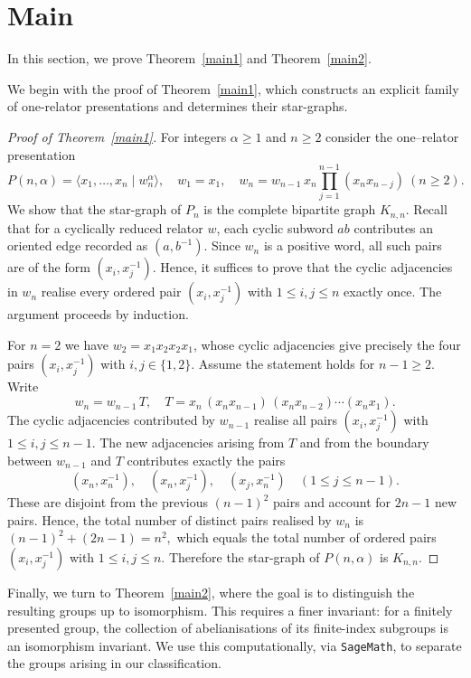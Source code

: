 \documentclass[a4paper,12pt,oneside]{article}
\begin{document}
\section{Main}\label{sec:proofs}

In this section, we prove Theorem~\ref{main1} and Theorem~\ref{main2}. 

\medskip
We begin with the proof of Theorem~\ref{main1}, which constructs an explicit family of one-relator presentations and determines their star-graphs. 
\begin{proof}[Proof of Theorem~\ref{main1}]
For integers $\alpha\ge 1$ and $n\geq 2$ consider the one--relator presentation
\[
P(n,\alpha)=\langle x_1,\dots,x_n\mid w_n^\alpha\rangle,
\quad 
 w_1=x_1,\quad 
 w_n=w_{n-1}\,x_n\prod_{j=1}^{n-1}(x_nx_{n-j})\ (n\ge 2).
\]
We show that the star-graph of $P_n$ is the complete bipartite graph $K_{n,n}$. Recall that for a cyclically reduced relator $w$, each cyclic subword $ab$ contributes an oriented edge recorded as $(a,b^{-1})$.  Since $w_n$ is a positive word, all such pairs are of the form $(x_i,x_j^{-1})$.  Hence, it suffices to prove that the cyclic adjacencies in $w_n$ realise every ordered pair $(x_i,x_j^{-1})$ with $1\le i,j\le n$ exactly once. The argument proceeds by induction. 

\medskip
For $n=2$ we have $w_2=x_1x_2x_2x_1$, whose cyclic adjacencies give precisely the four pairs $(x_i,x_j^{-1})$ with $i,j\in\{1,2\}$.  Assume the statement holds for $n-1\ge 2$.  Write
\[
w_n = w_{n-1}\,T,
\quad 
T = x_n\,(x_nx_{n-1})\,(x_nx_{n-2})\cdots(x_nx_1).
\]
The cyclic adjacencies contributed by $w_{n-1}$ realise all pairs $(x_i,x_j^{-1})$ with $1\le i,j\le n-1$.  The new adjacencies arising from $T$ and from the boundary between $w_{n-1}$ and $T$ contributes exactly the pairs
\[
(x_n,x_n^{-1}),\quad (x_n,x_j^{-1}),\quad (x_j,x_n^{-1}) \quad (1\le j\le n-1).
\]
These are disjoint from the previous $(n-1)^2$ pairs and account for $2n-1$ new pairs.  Hence, the total number of distinct pairs realised by $w_n$ is
\(
(n-1)^2+(2n-1)=n^2,
\)
which equals the total number of ordered pairs $(x_i,x_j^{-1})$ with $1\le i,j\le n$.  Therefore the star-graph of $P(n, \alpha)$ is $K_{n,n}$.
\end{proof}

Finally, we turn to Theorem~\ref{main2}, where the goal is to distinguish the resulting groups up to isomorphism. This requires a finer invariant: for a finitely presented group, the collection of abelianisations of its finite-index subgroups is an isomorphism invariant. We use this computationally, via \texttt{SageMath}, to separate the groups arising in our classification.
\end{document}

